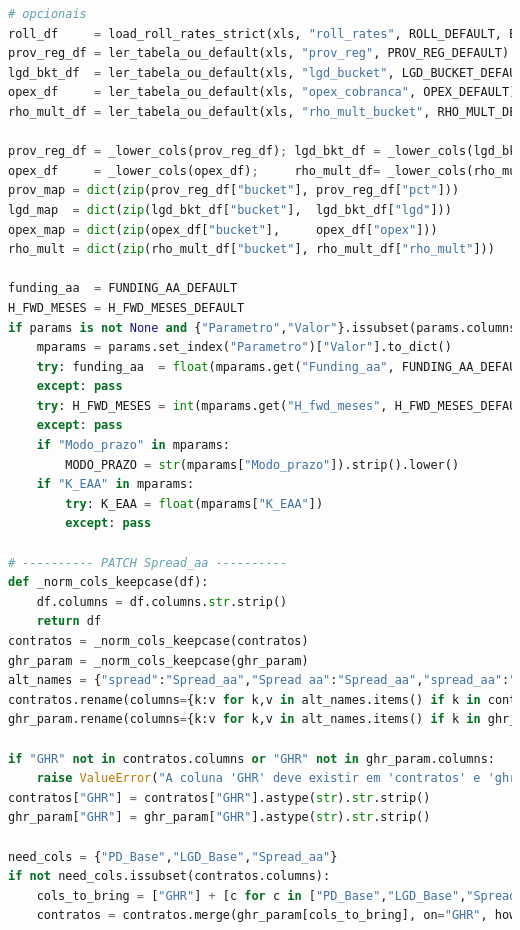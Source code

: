 \documentclass[11pt,a4paper]{article}
\newcommand{\1}{\mathbf{1}}
\begin{document}
\begin{lstlisting}[language=Python, caption={risk_frontier.py (versão completa com normalização por prazo e visões)}]
# opcionais
roll_df     = load_roll_rates_strict(xls, "roll_rates", ROLL_DEFAULT, BUCKETS)
prov_reg_df = ler_tabela_ou_default(xls, "prov_reg", PROV_REG_DEFAULT)
lgd_bkt_df  = ler_tabela_ou_default(xls, "lgd_bucket", LGD_BUCKET_DEFAULT)
opex_df     = ler_tabela_ou_default(xls, "opex_cobranca", OPEX_DEFAULT)
rho_mult_df = ler_tabela_ou_default(xls, "rho_mult_bucket", RHO_MULT_DEFAULT)

prov_reg_df = _lower_cols(prov_reg_df); lgd_bkt_df = _lower_cols(lgd_bkt_df)
opex_df     = _lower_cols(opex_df);     rho_mult_df= _lower_cols(rho_mult_df)
prov_map = dict(zip(prov_reg_df["bucket"], prov_reg_df["pct"]))
lgd_map  = dict(zip(lgd_bkt_df["bucket"],  lgd_bkt_df["lgd"]))
opex_map = dict(zip(opex_df["bucket"],     opex_df["opex"]))
rho_mult = dict(zip(rho_mult_df["bucket"], rho_mult_df["rho_mult"]))

funding_aa  = FUNDING_AA_DEFAULT
H_FWD_MESES = H_FWD_MESES_DEFAULT
if params is not None and {"Parametro","Valor"}.issubset(params.columns):
    mparams = params.set_index("Parametro")["Valor"].to_dict()
    try: funding_aa  = float(mparams.get("Funding_aa", FUNDING_AA_DEFAULT))
    except: pass
    try: H_FWD_MESES = int(mparams.get("H_fwd_meses", H_FWD_MESES_DEFAULT))
    except: pass
    if "Modo_prazo" in mparams:
        MODO_PRAZO = str(mparams["Modo_prazo"]).strip().lower()
    if "K_EAA" in mparams:
        try: K_EAA = float(mparams["K_EAA"])
        except: pass

# ---------- PATCH Spread_aa ----------
def _norm_cols_keepcase(df):
    df.columns = df.columns.str.strip()
    return df
contratos = _norm_cols_keepcase(contratos)
ghr_param = _norm_cols_keepcase(ghr_param)
alt_names = {"spread":"Spread_aa","Spread aa":"Spread_aa","spread_aa":"Spread_aa","SPREAD_AA":"Spread_aa"}
contratos.rename(columns={k:v for k,v in alt_names.items() if k in contratos.columns}, inplace=True)
ghr_param.rename(columns={k:v for k,v in alt_names.items() if k in ghr_param.columns}, inplace=True)

if "GHR" not in contratos.columns or "GHR" not in ghr_param.columns:
    raise ValueError("A coluna 'GHR' deve existir em 'contratos' e 'ghr_param'.")
contratos["GHR"] = contratos["GHR"].astype(str).str.strip()
ghr_param["GHR"] = ghr_param["GHR"].astype(str).str.strip()

need_cols = {"PD_Base","LGD_Base","Spread_aa"}
if not need_cols.issubset(contratos.columns):
    cols_to_bring = ["GHR"] + [c for c in ["PD_Base","LGD_Base","Spread_aa"] if c in ghr_param.columns]
    contratos = contratos.merge(ghr_param[cols_to_bring], on="GHR", how="left", validate="many_to_one")


\end{lstlisting}
\end{document}
